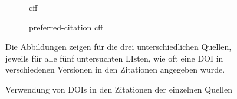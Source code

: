\begin{figure}
    \begin{subfigure}{.5\textwidth}
        \centering
        
        \caption{\gls{cff}}
        \label{fig:cff_doi}
    \end{subfigure}%
    \begin{subfigure}{.5\textwidth}
        \centering
        
        \caption{\glqq preferred-citation\grqq{} \gls{cff}}
        \label{fig:preferred_citation_doi}
    \end{subfigure}
    \centering
    \begin{subfigure}{.5\textwidth}
        \centering
        
        \caption{}
        \label{fig:bib_doi}
    \end{subfigure}
    \caption{Verwendung von DOIs in den Zitationen der einzelnen Quellen}
    \small
    \raggedright
    Die Abbildungen zeigen für die drei unterschiedlichen Quellen, jeweils für alle fünf untersuchten LIsten, wie oft eine DOI in verschiedenen Versionen in den Zitationen angegeben wurde.
\end{figure}


